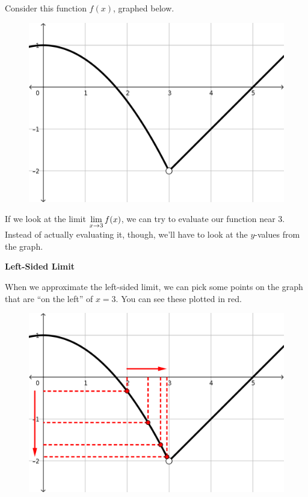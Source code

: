 Consider this function $f(x)$, graphed below.

\begin{figure}[h!tb]
  \includegraphics[scale=0.75]{./1_limits/images/1-1_graph1.png}
  \centering
\end{figure}

If we look at the limit $\displaystyle \lim_{x\to 3} f(x)$, we can try to evaluate our function near $3$.
Instead of actually evaluating it, though, we'll have to look at the $y$-values from the graph.

\textbf{Left-Sided Limit}

When we approximate the left-sided limit, we can pick some points on the graph that are ``on the left'' of $x=3$.
You can see these plotted in red.

\begin{figure}[h!tb]
  \includegraphics[scale=0.75]{./1_limits/images/1-1_graph1L.png}
  \centering
\end{figure}

